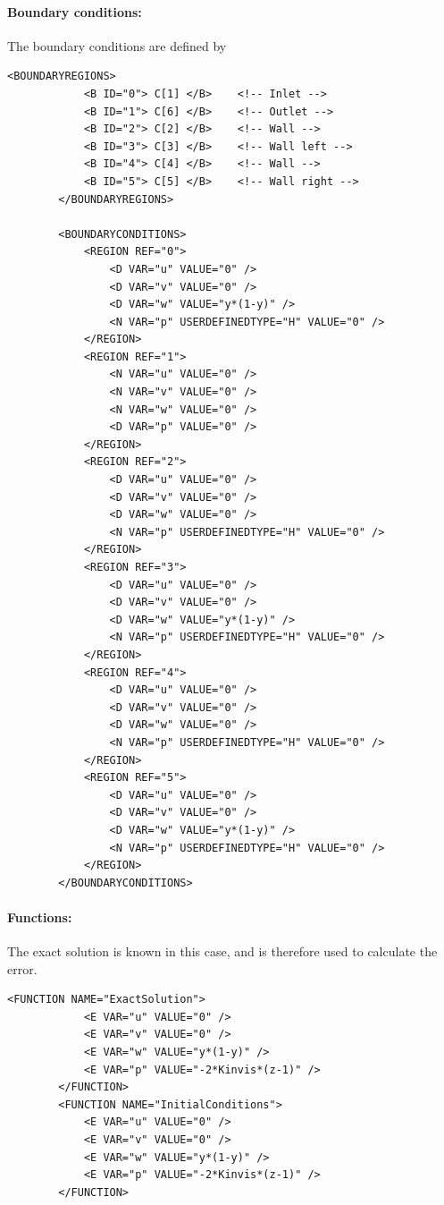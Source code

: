\paragraph{Boundary conditions:~} The boundary conditions are defined by
\begin{lstlisting}[style=XMLStyle]
        <BOUNDARYREGIONS>
            <B ID="0"> C[1] </B>    <!-- Inlet -->
            <B ID="1"> C[6] </B>    <!-- Outlet -->
            <B ID="2"> C[2] </B>    <!-- Wall -->
            <B ID="3"> C[3] </B>    <!-- Wall left -->
            <B ID="4"> C[4] </B>    <!-- Wall -->
            <B ID="5"> C[5] </B>    <!-- Wall right -->
        </BOUNDARYREGIONS>

        <BOUNDARYCONDITIONS>
            <REGION REF="0">
                <D VAR="u" VALUE="0" />
                <D VAR="v" VALUE="0" />
                <D VAR="w" VALUE="y*(1-y)" />
                <N VAR="p" USERDEFINEDTYPE="H" VALUE="0" />
            </REGION>
            <REGION REF="1">
                <N VAR="u" VALUE="0" />
                <N VAR="v" VALUE="0" />
                <N VAR="w" VALUE="0" />
                <D VAR="p" VALUE="0" />
            </REGION>
            <REGION REF="2">
                <D VAR="u" VALUE="0" />
                <D VAR="v" VALUE="0" />
                <D VAR="w" VALUE="0" />
                <N VAR="p" USERDEFINEDTYPE="H" VALUE="0" />
            </REGION>
            <REGION REF="3">
                <D VAR="u" VALUE="0" />
                <D VAR="v" VALUE="0" />
                <D VAR="w" VALUE="y*(1-y)" />
                <N VAR="p" USERDEFINEDTYPE="H" VALUE="0" />
            </REGION>
            <REGION REF="4">
                <D VAR="u" VALUE="0" />
                <D VAR="v" VALUE="0" />
                <D VAR="w" VALUE="0" />
                <N VAR="p" USERDEFINEDTYPE="H" VALUE="0" />
            </REGION>
            <REGION REF="5">
                <D VAR="u" VALUE="0" />
                <D VAR="v" VALUE="0" />
                <D VAR="w" VALUE="y*(1-y)" />
                <N VAR="p" USERDEFINEDTYPE="H" VALUE="0" />
            </REGION>
        </BOUNDARYCONDITIONS>
\end{lstlisting}

\paragraph{Functions:~} The exact solution is known in this case, and is therefore used to calculate the error.
\begin{lstlisting}[style=XMLStyle]
        <FUNCTION NAME="ExactSolution">
            <E VAR="u" VALUE="0" />
            <E VAR="v" VALUE="0" />
            <E VAR="w" VALUE="y*(1-y)" />
            <E VAR="p" VALUE="-2*Kinvis*(z-1)" />
        </FUNCTION>
        <FUNCTION NAME="InitialConditions">
            <E VAR="u" VALUE="0" />
            <E VAR="v" VALUE="0" />
            <E VAR="w" VALUE="y*(1-y)" />
            <E VAR="p" VALUE="-2*Kinvis*(z-1)" />
        </FUNCTION>
\end{lstlisting}

